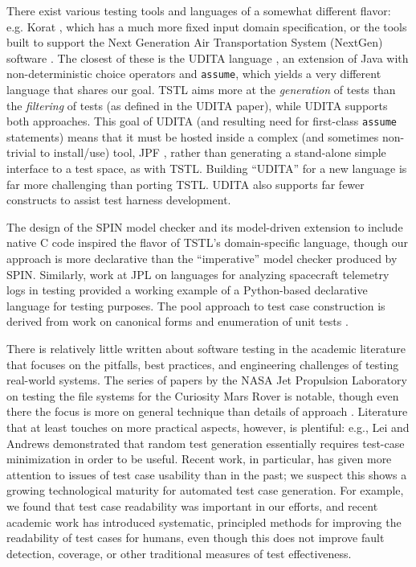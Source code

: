 There exist various testing tools and languages of a somewhat
different flavor: e.g. Korat \cite{Korat}, which has a much more fixed
input domain specification, or the tools built to support the Next
Generation Air Transportation System (NextGen) software
\cite{TameInputs}.  The closest of these is the UDITA language
\cite{UDITA}, an extension of Java with non-deterministic choice
operators and {\tt assume}, which yields a very different language
that shares our goal.  TSTL aims more at the \emph{generation} of
tests than the \emph{filtering} of tests (as defined in the UDITA
paper), while UDITA supports both approaches.  This goal of UDITA (and
resulting need for first-class {\tt assume} statements) means that it
must be hosted inside a complex (and sometimes non-trivial to
install/use) tool, JPF \cite{JPF2}, rather than generating a
stand-alone simple interface to a test space, as with TSTL.  Building
``UDITA'' for a new language is far more challenging than porting
TSTL.  UDITA also supports far fewer constructs to assist test harness
development.

The design of the SPIN model checker \cite{SPIN} and its model-driven
extension to include native C code \cite{ModelDriven} inspired the
flavor of TSTL's domain-specific language, though our approach is more
declarative than the ``imperative'' model checker produced by SPIN.
Similarly, work at JPL on languages for analyzing spacecraft telemetry
logs in testing \cite{scriptstospecs} provided a working example of a
Python-based declarative language for testing purposes.  The pool
approach to test case construction is derived from work on canonical
forms and enumeration of unit tests \cite{AndrewsTR}.

There is relatively little written about software testing in the
academic literature that focuses on the pitfalls, best practices, and
engineering challenges of testing real-world systems.  The series of
papers by the NASA Jet Propulsion Laboratory on testing the file
systems for the Curiosity Mars Rover is notable, though even there the
focus is more on general technique than details of approach
\cite{ICSEDiff,CFV08,AMAI}.  Literature that at least touches on more
practical aspects, however, is plentiful: e.g., Lei and Andrews
\cite{MinUnit} demonstrated that random test generation essentially
requires test-case minimization \cite{DD} in order to be useful.
Recent work, in particular, has given more attention to issues of test case usability
than in the past; we suspect this shows a growing technological
maturity for automated test case generation.  For example, we found
that test case readability was important in our efforts, and recent
academic work \cite{Readable,Guava} has introduced systematic,
principled methods for improving the readability of test cases for
humans, even though this does not improve fault detection, coverage,
or other traditional measures of test effectiveness.

